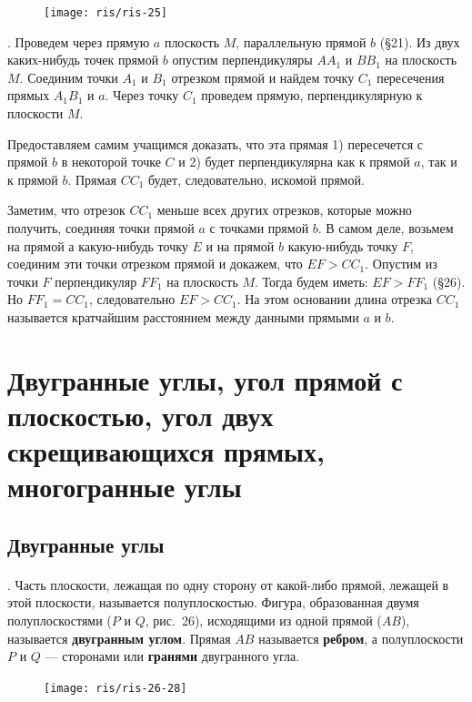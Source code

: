 \documentclass[twoside]{book}
\begin{document}
\begin{figure}[h!]
\centering
\texttt{[image: ris/ris-25]}
\caption{}
\end{figure}

.
Проведем через прямую $a$ плоскость $M$, параллельную прямой $b$ (§21).
Из двух каких-нибудь точек прямой $b$ опустим перпендикуляры $AA_1$ и $BB_1$ на плоскость $M$.
Соединим точки $A_1$ и $B_1$ отрезком прямой и найдем точку $C_1$ пересечения прямых $A_1B_1$ и $a$.
Через точку $C_1$ проведем прямую, перпендикулярную к плоскости $M$.

Предоставляем самим учащимся доказать, что эта прямая 1) пересечется с прямой $b$ в некоторой точке $C$ и 2) будет перпендикулярна как к прямой $a$, так и к прямой $b$.
Прямая $CC_1$ будет, следовательно, искомой прямой.

Заметим, что отрезок $CC_1$ меньше всех других отрезков, которые можно получить, соединяя точки прямой $a$ с точками прямой $b$.
В самом деле, возьмем на прямой а какую-нибудь точку $E$ и на прямой $b$ какую-нибудь точку $F$, соединим эти точки отрезком прямой и докажем, что $EF>CC_1$.
Опустим из точки $F$ перпендикуляр $FF_1$ на плоскость $M$.
Тогда будем иметь: $EF>FF_1$ (§26).
Но $FF_1=CC_1$, следовательно $EF>CC_1$.
На этом основании длина отрезка $CC_1$ называется кратчайшим расстоянием между данными прямыми $a$ и $b$.

\section[Углы]{Двугранные углы,
угол прямой с плоскостью,
угол двух скрещивающихся прямых,
многогранные углы}

\subsection*{Двугранные углы}

\paragraph{}\label{1938/s38}
.
Часть плоскости, лежащая по одну сторону от какой-либо прямой, лежащей в этой плоскости, называется полуплоскостью.
Фигура, образованная двумя полуплоскостями ($P$ и $Q$, рис.~26), исходящими из одной прямой ($AB$), называется \textbf{двугранным углом}.
Прямая $AB$ называется \textbf{ребром}, а полуплоскости $P$ и $Q$ --- сторонами или \textbf{гранями} двугранного угла.

\begin{figure}[h!]
\centering
\texttt{[image: ris/ris-26-28]}
\caption{}
\end{figure}
\end{document}
